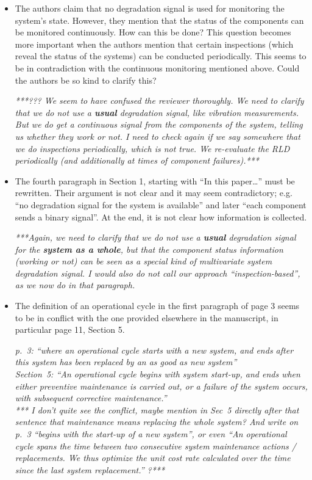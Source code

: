 \documentclass[authoryear]{elsarticle}
\begin{document}
\begin{itemize}
\item The authors claim that no degradation signal is used for monitoring the system’s state. However, they mention that the status of the components can be monitored continuously. How can this be done? This question becomes more important when the authors mention that certain inspections (which reveal the status of the systems) can be conducted periodically. This seems to be in contradiction with the continuous monitoring mentioned above. Could the authors be so kind to clarify this?

\smallskip

\emph{***??? We seem to have confused the reviewer thoroughly.
We need to clarify that we do not use a \textbf{usual} degradation signal, like vibration measurements.
But we do get a continuous signal from the components of the system, telling us whether they work or not.
I need to check again if we say somewhere that we do inspections periodically, which is not true.
We re-evaluate the RLD periodically (and additionally at times of component failures).***}

\item The fourth paragraph in Section 1, starting with “In this paper…” must be rewritten. Their argument is not clear and it may seem contradictory; e.g. “no degradation signal for the system is available” and later “each component sends a binary signal”. At the end, it is not clear how information is collected.

\smallskip

\emph{***Again, we need to clarify that we do not use a \textbf{usual} degradation signal for the \textbf{system as a whole},
but that the component status information (working or not) can be seen as a special kind of multivariate system degradation signal.
I would also do not call our approach ``inspection-based'', as we now do in that paragraph.}

\item The definition of an operational cycle in the first paragraph of page 3 seems to be in conflict with the one provided elsewhere in the manuscript, in particular page 11, Section 5.

\smallskip

\emph{p.~3: ``where an operational cycle starts with a new system,
and ends after this system has been replaced by an as good as new system''\\
Section~5: ``An operational cycle begins with system start-up,
and ends when either preventive maintenance is carried out, or a failure of the system occurs,
with subsequent corrective maintenance.''\\
*** I don't quite see the conflict, maybe mention in Sec~5 directly after that sentence that maintenance means replacing the whole system?
And write on p.~3 ``begins with the start-up of a new system'', or even
``An operational cycle spans the time between two consecutive system maintenance actions / replacements.
We thus optimize the unit cost rate calculated over the time since the last system replacement.''
?***}


\end{itemize}
\end{document}
